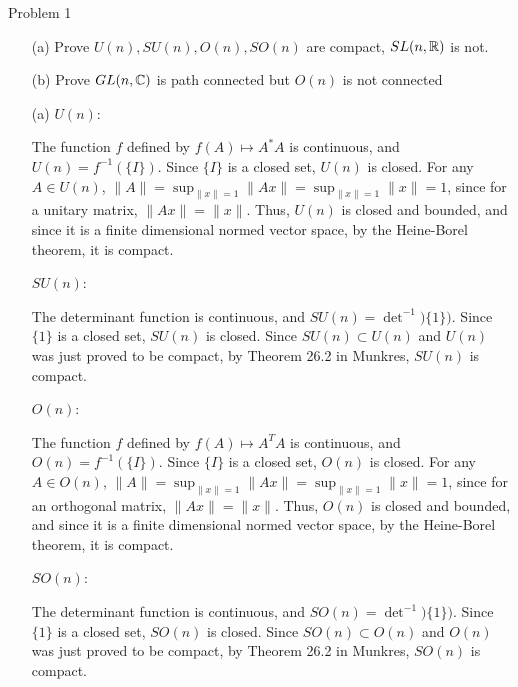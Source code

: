 \documentclass{hmwk}
\begin{document}
\maketitle

\begin{problem}{Problem 1}
\begin{itemize}
    \item[(a)] Prove $U(n), SU(n), O(n), SO(n)$ are compact, $SL(n, \mathbb{R})$ is not. 
    \item[(b)] Prove $GL(n, \mathbb{C})$ is path connected but $O(n)$ is not connected
\end{itemize}
\end{problem}

\begin{solution}
\begin{itemize}
    \item[(a)] $U(n)$:

    The function $f$ defined by $f(A) \mapsto A^*A$ is continuous, and $U(n) = f^{-1}(\{I\})$. Since $\{I\}$ is a closed set, $U(n)$ is closed. For any $A \in U(n)$, $\|A\| = \sup_{\|x\| = 1}\|Ax\| = \sup_{\|x\| = 1} \|x\| = 1$, since for a unitary matrix, $\|Ax\| = \|x\|$. Thus, $U(n)$ is closed and bounded, and since it is a finite dimensional normed vector space, by the Heine-Borel theorem, it is compact. 

    \pre $SU(n)$:

    The determinant function is continuous, and $SU(n) = \det^{-1})\{1\})$. Since $\{1\}$ is a closed set, $SU(n)$ is closed. Since $SU(n) \subset U(n)$ and $U(n)$ was just proved to be compact, by Theorem 26.2 in Munkres, $SU(n)$ is compact. 

    \pre $O(n)$:

    The function $f$ defined by $f(A) \mapsto A^TA$ is continuous, and $O(n) = f^{-1}(\{I\})$. Since $\{I\}$ is a closed set, $O(n)$ is closed. For any $A \in O(n)$, $\|A\| = \sup_{\|x\| = 1}\|Ax\| = \sup_{\|x\| = 1} \|x\| = 1$, since for an orthogonal matrix, $\|Ax\| = \|x\|$. Thus, $O(n)$ is closed and bounded, and since it is a finite dimensional normed vector space, by the Heine-Borel theorem, it is compact. 

    \pre $SO(n)$:

    The determinant function is continuous, and $SO(n) = \det^{-1})\{1\})$. Since $\{1\}$ is a closed set, $SO(n)$ is closed. Since $SO(n) \subset O(n)$ and $O(n)$ was just proved to be compact, by Theorem 26.2 in Munkres, $SO(n)$ is compact. 


\end{itemize}
\end{solution}
\end{document}
